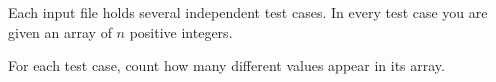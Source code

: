 Each input file holds several independent test cases. In every test case you are given an array of $n$ positive integers.

For each test case, count how many different values appear in its array.
